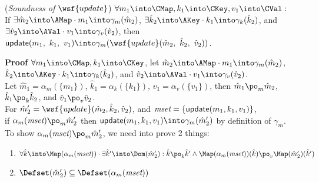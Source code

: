 \begin{thm} \normalfont
(\textit{Soundness of} $\wsf{update}$) 
$\forall m_1 \into \CMap, k_1 \into \CKey, v_1 \into \CVal :$\\
If $\exists \hat{m}_2 \into \AMap \cdot m_1 \into \gamma_m(\hat{m}_2)$,
$\exists \hat{k}_2 \into \AKey \cdot k_1 \into \gamma_k(\hat{k}_2)$,
and $\exists \hat{v}_2 \into \AVal \cdot v_1 \into \gamma_v(\hat{v}_2)$,
then $\textsf{update}(m_1,\ k_1,\ v_1) \into \gamma_m(\wsf{update}(\hat{m}_2,\ \hat{k}_2,\ \hat{v}_2))$.
\end{thm}
\textbf{Proof } $\forall m_1 \into \CMap, k_1 \into \CKey$,
let $\hat{m}_2 \into \AMap \cdot m_1 \into \gamma_m(\hat{m}_2)$,
$\hat{k}_2 \into \AKey \cdot k_1 \into \gamma_k(\hat{k}_2)$,
and $\hat{v}_2 \into \AVal \cdot v_1 \into \gamma_v(\hat{v}_2)$.\\
Let $\hat{m}_1 = \alpha_m(\{ m_1 \})$,
$\hat{k}_1 = \alpha_k(\{ k_1 \})$,
$\hat{v}_1 = \alpha_v(\{ v_1 \})$,
then $\hat{m}_1 \po_m \hat{m}_2$,
$\hat{k}_1 \po_k \hat{k}_2$,
and $\hat{v}_1 \po_v \hat{v}_2$.\\
For $\hat{m}_2' = \wsf{update}(\hat{m}_2, \hat{k}_2, \hat{v}_2)$,
and $\emph{mset} = \{ \textsf{update}(m_1, k_1, v_1) \}$, \\
if $\alpha_m(\emph{mset}) \po_m \hat{m}_2'$
then $\textsf{update}(m_1, k_1, v_1) \into \gamma_m(\hat{m}_2')$
by definition of $\gamma_m$.\\
To show $\alpha_m(\emph{mset}) \po_m \hat{m}_2'$, we need into prove 2 things:
\begin{enumerate}[label=({\arabic*})]
\item $\forall \hat{k} \into \Map(\alpha_m(\emph{mset})) \cdot
\exists \hat{k}' \into \Dom(\hat{m}_2'):
\hat{k} \po_k \hat{k}' \land \Map(\alpha_m(\emph{mset}))(\hat{k}) \po_v \Map(\hat{m}_2')(\hat{k}')$
\item $\Defset(\hat{m}_2') \subseteq \Defset(\alpha_m(\emph{mset}))$
\end{enumerate}
